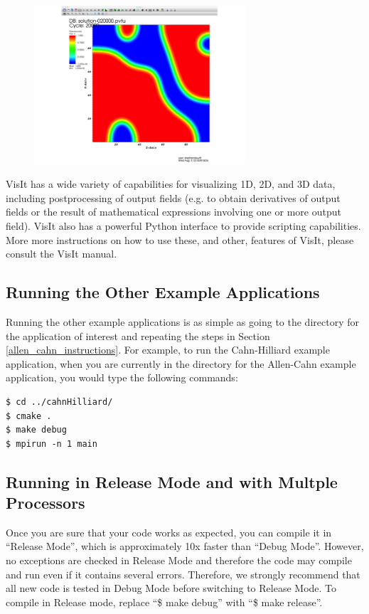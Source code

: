 \documentclass[10pt]{article} %
\begin{document}
\begin{figure}[H]
\vspace{0pt}
\centering
\includegraphics[width=0.7\textwidth]{visit_final_result.png}
\vspace{0pt}
\end{figure}

VisIt has a wide variety of capabilities for visualizing 1D, 2D, and 3D data, including postprocessing of output fields (e.g. to obtain derivatives of output fields or the result of mathematical expressions involving one or more output field). VisIt also has a powerful Python interface to provide scripting capabilities. More more instructions on how to use these, and other, features of VisIt, please consult the VisIt manual.

\subsection{Running the Other Example Applications}
Running the other example applications is as simple as going to the directory for the application of interest and repeating the steps in Section \ref{allen_cahn_instructions}. For example, to run the Cahn-Hilliard example application, when you are currently in the directory for the Allen-Cahn example application, you would type the following commands:
\begin{lstlisting}
$ cd ../cahnHilliard/ 
$ cmake . 
$ make debug 
$ mpirun -n 1 main 
\end{lstlisting}

\subsection{Running in Release Mode and with Multple Processors}
Once you are sure that your code works as expected, you can compile it in ``Release Mode'', which is approximately 10x faster than ``Debug Mode''. However, no exceptions are checked in Release Mode and therefore the code may compile and run even if it contains several errors. Therefore, we strongly recommend that all new code is tested in Debug Mode before switching to Release Mode. To compile in Release mode, replace ``\$ make debug'' with ``\$ make release''.
\end{document}
